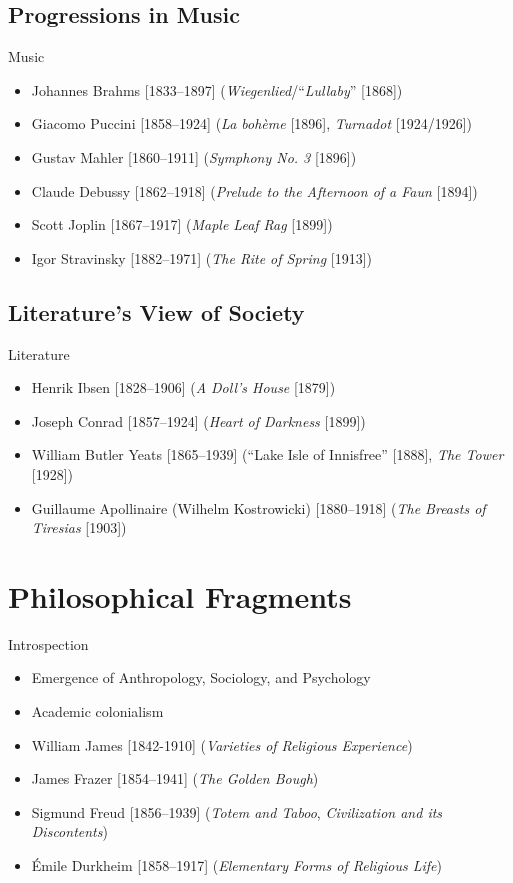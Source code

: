 \subsection{Progressions in Music}
\begin{frame}{Music}
	\begin{itemize}
		\item<+->Johannes Brahms [1833--1897] (\emph{Wiegenlied}/``\emph{Lullaby}'' [1868])
		\item<+->Giacomo Puccini [1858--1924] (\emph{La boh{\`e}me} [1896], \emph{Turnadot} [1924/1926])
		\item<+->Gustav Mahler [1860--1911] (\emph{Symphony No. 3} [1896])
		\item<+->Claude Debussy [1862--1918] (\emph{Prelude to the Afternoon of a Faun} [1894])
		\item<+->Scott Joplin [1867--1917] (\emph{Maple Leaf Rag} [1899])
		\item<+->Igor Stravinsky [1882--1971] (\emph{The Rite of Spring} [1913])
	\end{itemize}
\end{frame}

\subsection{Literature's View of Society}
\begin{frame}{Literature}
	\begin{itemize}
		\item<+->Henrik Ibsen [1828--1906] (\emph{A Doll's House} [1879])
		\item<+->Joseph Conrad [1857--1924] (\emph{Heart of Darkness} [1899])
		\item<+->William Butler Yeats [1865--1939] (``Lake Isle of Innisfree'' [1888], \emph{The Tower} [1928])
		\item<+->Guillaume Apollinaire (Wilhelm Kostrowicki) [1880--1918] (\emph{The Breasts of Tiresias} [1903])
	\end{itemize}
\end{frame}

\timeout

\section{Philosophical Fragments}
\begin{frame}{Introspection}
	\begin{itemize}
		\item<+->Emergence of Anthropology, Sociology, and Psychology
		\item<+->Academic colonialism
		\item<+->William James [1842-1910] (\emph{Varieties of Religious Experience})
		\item<+->James Frazer [1854--1941] (\emph{The Golden Bough})
		\item<+->Sigmund Freud [1856--1939] (\emph{Totem and Taboo}, \emph{Civilization and its Discontents})
		\item<+->{\'E}mile Durkheim [1858--1917] (\emph{Elementary Forms of Religious Life})
	\end{itemize}
\end{frame}

